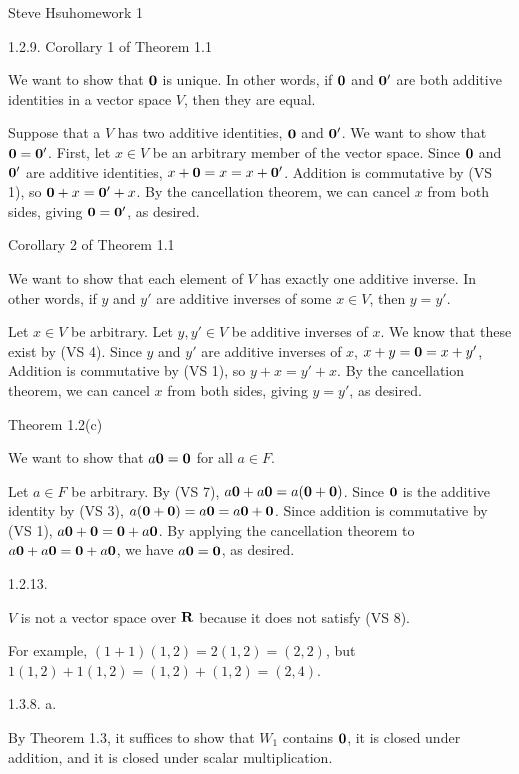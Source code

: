\def\zero{{\bf 0}}
\def\real{{\bf R}}
\centerline{Steve Hsu\hfill homework 1}
\medskip\goodbreak
\item{1.2.9.} Corollary 1 of Theorem 1.1

We want to show that $\zero$ is unique.
In other words, if $\zero$ and $\zero'$ are both additive identities
in a vector space $V$, then they are equal.

Suppose that a $V$ has two additive identities, $\zero$ and $\zero'$.
We want to show that $\zero = \zero'$.
First, let $x \in V$ be an arbitrary member of the vector space.
Since $\zero$ and $\zero'$ are additive identities,
$x + \zero = x = x + \zero'$.
Addition is commutative by (VS 1), so $\zero + x = \zero' + x$.
By the cancellation theorem, we can cancel $x$ from both sides,
giving $\zero = \zero'$, as desired.

\item{} Corollary 2 of Theorem 1.1

We want to show that each element of $V$ has exactly one additive inverse.
In other words, if $y$ and $y'$ are additive inverses of some $x \in V$,
then $y = y'$.

Let $x \in V$ be arbitrary.
Let $y, y' \in V$ be additive inverses of $x$.
We know that these exist by (VS 4).
Since $y$ and $y'$ are additive inverses of $x$,
$x + y = \zero = x + y'$,
Addition is commutative by (VS 1), so $y + x = y' + x$.
By the cancellation theorem, we can cancel $x$ from both sides,
giving $y = y'$, as desired.

\item{} Theorem 1.2(c)

We want to show that $a\zero = \zero$ for all $a \in F$.

Let $a \in F$ be arbitrary.
By (VS 7), $a\zero + a\zero = a(\zero + \zero)$.
Since $\zero$ is the additive identity by (VS 3),
$a(\zero + \zero) = a\zero = a\zero + \zero$.
Since addition is commutative by (VS 1), $a\zero + \zero = \zero + a\zero$.
By applying the cancellation theorem to $a\zero + a\zero = \zero + a\zero$,
we have $a\zero = \zero$, as desired.
\medskip\goodbreak
\item{1.2.13.}

$V$ is not a vector space over $\real$
because it does not satisfy (VS 8).

For example, $(1 + 1)(1,2) = 2(1,2) = (2,2)$,
but $1(1,2) + 1(1,2) = (1,2) + (1,2) = (2,4)$.
\medskip\goodbreak
\item{1.3.8.} a.

By Theorem 1.3, it suffices to show that
$W_1$ contains $\zero$, it is closed under addition,
and it is closed under scalar multiplication.

